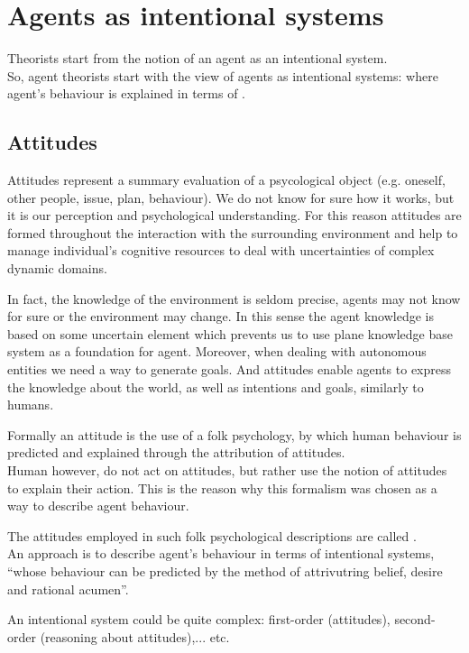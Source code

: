 \section{Agents as intentional systems}
Theorists start from the notion of an agent as an intentional system.\\
So, agent theorists start with the view of agents as intentional systems: where agent's behaviour is explained in terms of .
\subsection{Attitudes}
Attitudes represent a summary evaluation of a psycological object (e.g. oneself, other people, issue, plan, behaviour). We do not know for sure how it works, but it is our perception and psychological understanding.
For this reason attitudes are formed throughout the interaction with the surrounding environment and help to manage individual's cognitive resources to deal with uncertainties of complex dynamic domains.

In fact, the knowledge of the environment is seldom precise, agents may not know for sure or the environment may change. In this sense the agent knowledge is based on some uncertain element which prevents us to use plane knowledge base system as a foundation for agent. Moreover,  when dealing with autonomous entities we need a way to generate goals. And attitudes enable agents to express the knowledge about the world, as well as intentions and goals, similarly to humans.

Formally an attitude is the use of a folk psychology, by which human behaviour is predicted and explained through the attribution of attitudes.\\
Human however, do not act on attitudes, but rather use the notion of attitudes to explain their action. This is the reason why this formalism was chosen as a way to describe agent behaviour.

The attitudes employed in such folk psychological descriptions are called .\\
An approach is to describe agent's behaviour in terms of intentional systems, ``whose behaviour can be predicted by the method of attrivutring belief, desire and rational acumen''.

An intentional system could be quite complex: first-order (attitudes), second-order (reasoning about attitudes),... etc.

